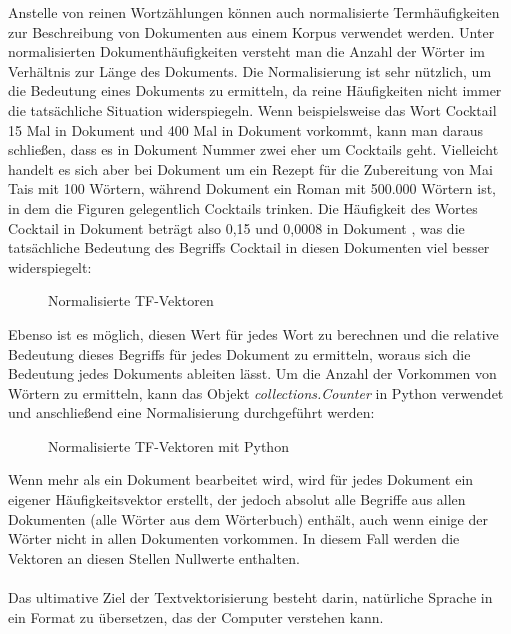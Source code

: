 Anstelle von reinen Wortzählungen können auch normalisierte Termhäufigkeiten zur Beschreibung von Dokumenten aus einem Korpus verwendet werden. 
Unter normalisierten Dokumenthäufigkeiten versteht man die Anzahl der Wörter im Verhältnis zur Länge des Dokuments. 
Die Normalisierung ist sehr nützlich, um die Bedeutung eines Dokuments zu ermitteln, da reine Häufigkeiten nicht immer die tatsächliche Situation widerspiegeln. 
Wenn beispielsweise das Wort \glqq Cocktail\grqq{} 15 Mal in Dokument  und 400 Mal in Dokument  vorkommt, kann man daraus schließen, dass es in Dokument Nummer zwei eher um Cocktails geht.
Vielleicht handelt es sich aber bei Dokument  um ein Rezept für die Zubereitung von Mai Tais mit 100 Wörtern, während Dokument  ein Roman mit 500.000 Wörtern ist, in dem die Figuren gelegentlich Cocktails trinken. 
Die Häufigkeit des Wortes \glqq Cocktail\grqq{} in Dokument  beträgt also 0,15 und 0,0008 in Dokument , was die tatsächliche Bedeutung des Begriffs \glqq Cocktail\grqq{} in diesen Dokumenten viel besser widerspiegelt:
\begin{figure}[H]
    \centering
    \caption{\label{figure:Norm_Vektoren}Normalisierte \ac{TF}-Vektoren}
\end{figure}
\noindent
Ebenso ist es möglich, diesen Wert für jedes Wort zu berechnen und die relative Bedeutung dieses Begriffs für jedes Dokument zu ermitteln, woraus sich die Bedeutung jedes Dokuments ableiten lässt. 
Um die Anzahl der Vorkommen von Wörtern zu ermitteln, kann das Objekt \textit{collections.Counter} in Python verwendet und anschließend eine Normalisierung durchgeführt werden:
\begin{figure}[H]
    \centering
    \caption{\label{figure:Norm_Vektoren_Python}Normalisierte \ac{TF}-Vektoren mit Python}
\end{figure}
\noindent
Wenn mehr als ein Dokument bearbeitet wird, wird für jedes Dokument ein eigener Häufigkeitsvektor erstellt, der jedoch absolut alle Begriffe aus allen Dokumenten (alle Wörter aus dem Wörterbuch) enthält, auch wenn einige der Wörter nicht in allen Dokumenten vorkommen. 
In diesem Fall werden die Vektoren an diesen Stellen Nullwerte enthalten.\\\\
Das ultimative Ziel der Textvektorisierung besteht darin, natürliche Sprache in ein Format zu übersetzen, das der Computer verstehen kann. 
